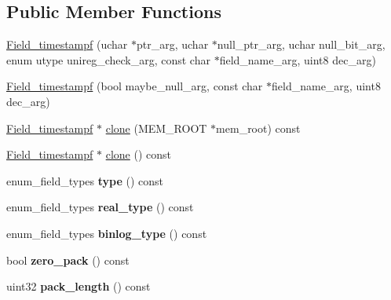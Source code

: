 \subsection*{Public Member Functions}
\begin{DoxyCompactItemize}
\item 
\mbox{\hyperlink{classField__timestampf_a2f06a04cbc5f999c3c16413a3a489b5c}{Field\+\_\+timestampf}} (uchar $\ast$ptr\+\_\+arg, uchar $\ast$null\+\_\+ptr\+\_\+arg, uchar null\+\_\+bit\+\_\+arg, enum utype unireg\+\_\+check\+\_\+arg, const char $\ast$field\+\_\+name\+\_\+arg, uint8 dec\+\_\+arg)
\item 
\mbox{\hyperlink{classField__timestampf_a295e7094e04ac48345169ba4fbb8554c}{Field\+\_\+timestampf}} (bool maybe\+\_\+null\+\_\+arg, const char $\ast$field\+\_\+name\+\_\+arg, uint8 dec\+\_\+arg)
\item 
\mbox{\hyperlink{classField__timestampf}{Field\+\_\+timestampf}} $\ast$ \mbox{\hyperlink{classField__timestampf_a3bdae27b50d4fd72389c812bdd3572c1}{clone}} (M\+E\+M\+\_\+\+R\+O\+OT $\ast$mem\+\_\+root) const
\item 
\mbox{\hyperlink{classField__timestampf}{Field\+\_\+timestampf}} $\ast$ \mbox{\hyperlink{classField__timestampf_af54ee85e3a46fb9852c2e0770e639e5b}{clone}} () const
\item 
\mbox{\label{classField__timestampf_ac132b90350dedfa253e2e233b0fe3951}} 
enum\+\_\+field\+\_\+types {\bfseries type} () const
\item 
\mbox{\label{classField__timestampf_a8c588d5e1a36efa33ffe598f21882a49}} 
enum\+\_\+field\+\_\+types {\bfseries real\+\_\+type} () const
\item 
\mbox{\label{classField__timestampf_ab17bcb9a4ceba958a09a2138e26970f6}} 
enum\+\_\+field\+\_\+types {\bfseries binlog\+\_\+type} () const
\item 
\mbox{\label{classField__timestampf_a6f8330d4740897e0e04d986faefa6fa9}} 
bool {\bfseries zero\+\_\+pack} () const
\item 
\mbox{\label{classField__timestampf_a991905ed5407bb4382f5485d992d6439}} 
uint32 {\bfseries pack\+\_\+length} () const
\item 
\mbox{\label{classField__timestampf_ada463bfaf4a7dab104f935d341b2a773}} 

\end{DoxyCompactItemize}
